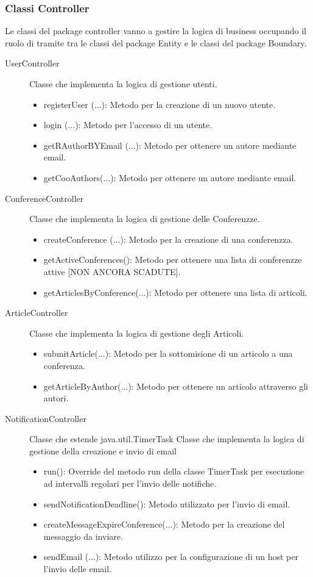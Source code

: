 \subsubsection{Classi Controller}
Le classi del package controller vanno a gestire la logica di business occupando il ruolo di tramite tra le classi del package Entity e le classi del package Boundary.
\begin{description}
\item[UserController] Classe che implementa la logica di gestione utenti.
    \begin{itemize}
        \item registerUser (...): Metodo per la creazione di un nuovo utente.
        \item login (...): Metodo per l'accesso di un utente.
        \item getRAuthorBYEmail (...): Metodo per ottenere un autore mediante email.
        \item getCooAuthors(...): Metodo per ottenere un autore mediante email.
    \end{itemize}
\item[ConferenceController] Classe che implementa la logica di gestione delle Conferenzze.
    \begin{itemize}
        \item createConference (...): Metodo per la creazione di una conferenzza.
        \item getActiveConferences(): Metodo per ottenere una lista di conferenzze attive [NON ANCORA SCADUTE].
        \item getArticlesByConference(...): Metodo per ottenere una lista di articoli.
    \end{itemize}
\item[ArticleController] Classe che implementa la logica di gestione degli Articoli.
    \begin{itemize}
        \item submitArticle(...): Metodo per la sottomisione di un articolo a una conferenza.
        \item getArticleByAuthor(...): Metodo per ottenere un articolo attraverso gli autori.
    \end{itemize}
\item[NotificationController] Classe che estende java.util.TimerTask Classe che implementa la logica di gestione della creazione e invio di email
    \begin{itemize}
        \item run(): Override del metodo run della classe TimerTask per esecuzione ad intervalli regolari per l'invio delle notifiche.
        \item sendNotificationDeadline(): Metodo utilizzato per l'invio di email.
        \item createMessageExpireConference(...): Metodo per la creazione del messaggio da inviare.
        \item sendEmail (...): Metodo utilizzo per la configurazione di un host per l'invio delle email.
    \end{itemize}
\end{description}

